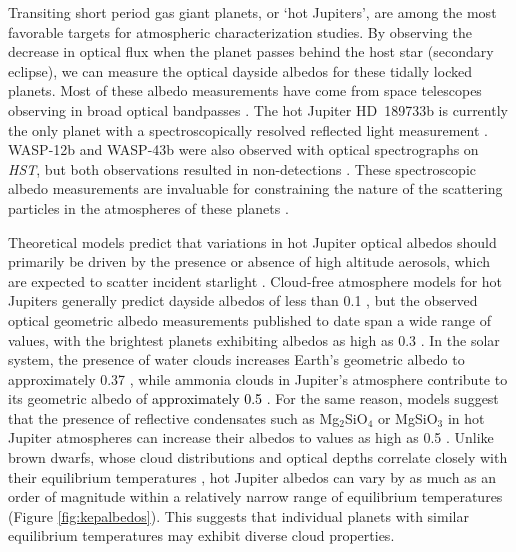 \documentclass[twocolumn]{aastex63}
\begin{document}
Transiting short period gas giant planets, or `hot Jupiters', are among the most favorable targets for atmospheric characterization studies. By observing the decrease in optical flux when the planet passes behind the host star (secondary eclipse), we can measure the optical dayside albedos for these tidally locked planets. Most of these albedo measurements have come from space telescopes observing in broad optical bandpasses \citep[e.g.][]{rowe2008,kipping2011,demory2011,demory2013,coughlin2012,parviainen2013,angerhausen2014,vonparis2016,niraula2018}. The hot Jupiter HD~189733b is currently the only planet with a spectroscopically resolved reflected light measurement \citep[][geometric albedo of $0.40\pm0.12$ at $290-450$ nm and $<0.12$ at $450-570$ nm]{evans2013}.  WASP-12b and WASP-43b were also observed with optical spectrographs on \emph{HST}, but both observations resulted in non-detections \citep[][geometric albedos $<0.06$]{bell2017,fraine2021}.  These spectroscopic albedo measurements are invaluable for constraining the nature of the scattering particles in the atmospheres of these planets \citep[e.g.][]{barstow2014}.   

Theoretical models predict that variations in hot Jupiter optical albedos should primarily be driven by the presence or absence of high altitude aerosols, which are expected to scatter incident starlight \citep[e.g.][]{seager2000,burrows2008}. Cloud-free atmosphere models for hot Jupiters generally predict dayside albedos of less than 0.1 \citep{seager2000}, but the observed optical geometric albedo measurements published to date span a wide range of values, with the brightest planets exhibiting albedos as high as $0.3$ \citep[e.g.][]{Heng_2013,niraula2018}.  In the solar system, the presence of water clouds increases Earth's geometric albedo to approximately 0.37 \citep[e.g.][]{goode2001}, while ammonia clouds in Jupiter's atmosphere contribute to its geometric albedo of \textcolor{black}{approximately 0.5} \citep[e.g.][]{marley1999}.  For the same reason, models suggest that the presence of reflective condensates such as Mg$_2$SiO$_4$ or MgSiO$_3$ in hot Jupiter atmospheres can increase their albedos to values as high as 0.5 \citep{parmentier2016,parmentier2021,roman2021}.  Unlike brown dwarfs, whose cloud distributions and optical depths correlate closely with their equilibrium temperatures \citep[e.g.][]{kirkpatrick2005,marley2010}, hot Jupiter albedos can vary by as much as an order of magnitude within a relatively narrow range of equilibrium temperatures (Figure \ref{fig:kepalbedos}). This suggests that individual planets with similar equilibrium temperatures may exhibit diverse cloud properties.
\end{document}
